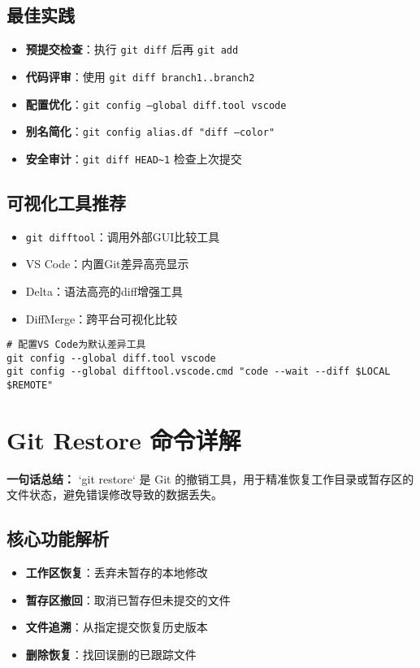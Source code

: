 \subsection{最佳实践}
\begin{itemize}[leftmargin=*, nosep]
    \item \textbf{预提交检查}：执行 \texttt{git diff} 后再 \texttt{git add}
    \item \textbf{代码评审}：使用 \texttt{git diff branch1..branch2}
    \item \textbf{配置优化}：\texttt{git config --global diff.tool vscode}
    \item \textbf{别名简化}：\texttt{git config alias.df "diff --color"}
    \item \textbf{安全审计}：\texttt{git diff HEAD\textasciitilde1} 检查上次提交
\end{itemize}

\subsection{可视化工具推荐}
\begin{itemize}[leftmargin=*, nosep]
    \item \texttt{git difftool}：调用外部GUI比较工具
    \item VS Code：内置Git差异高亮显示
    \item Delta：语法高亮的diff增强工具
    \item DiffMerge：跨平台可视化比较
\end{itemize}

\begin{verbatim}
# 配置VS Code为默认差异工具
git config --global diff.tool vscode
git config --global difftool.vscode.cmd "code --wait --diff $LOCAL $REMOTE"
\end{verbatim}


\section{Git Restore 命令详解}
\textbf{一句话总结：}  
`git restore` 是 Git 的撤销工具，用于精准恢复工作目录或暂存区的文件状态，避免错误修改导致的数据丢失。

\subsection{核心功能解析}
\begin{itemize}[leftmargin=*, nosep]
    \item \textbf{工作区恢复}：丢弃未暂存的本地修改
    \item \textbf{暂存区撤回}：取消已暂存但未提交的文件
    \item \textbf{文件追溯}：从指定提交恢复历史版本
    \item \textbf{删除恢复}：找回误删的已跟踪文件
\end{itemize}

